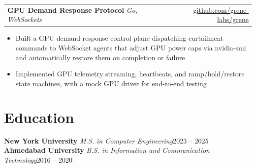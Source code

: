 \documentclass[letterpaper,12pt]{article}
\makeatletter
\newcommand{\project}[3]{%
  \begin{tabularx}{\textwidth}{@{}X@{}r@{}}
    \textbf{#1}\; {\small\color{muted}\itshape #2} & {\small #3} \\
  \end{tabularx}\vspace{3.5pt}
}
\newenvironment{bullets}
  {\begin{itemize}[leftmargin=1.1em, itemsep=0pt, topsep=0pt, parsep=0pt, label={\color{muted}\footnotesize\textbullet}]\fontsize{11}{13.0}\selectfont}
  {\end{itemize}\vspace{-3pt}}
\makeatother
\begin{document}
\vspace{6pt}
\project{GPU Demand Response Protocol}{Go, WebSockets}{\href{https://github.com/grene-labs/grene}{github.com/grene-labs/grene}}
\begin{bullets}
  \item Built a GPU demand-response control plane dispatching curtailment commands to WebSocket agents that adjust GPU power caps via nvidia-smi and automatically restore them on completion or failure
  \item Implemented GPU telemetry streaming, heartbeats, and ramp/hold/restore state machines, with a mock GPU driver for end-to-end testing
\end{bullets}

\section{Education}
\textbf{New York University}\hspace{.5em} {\small\itshape M.S. in Computer Engineering}\hfill{\small\color{muted}2023 -- 2025}\\[1pt]
\textbf{Ahmedabad University}\hspace{.5em} {\small\itshape B.S. in Information and Communication Technology}\hfill{\small\color{muted}2016 -- 2020}
\end{document}
